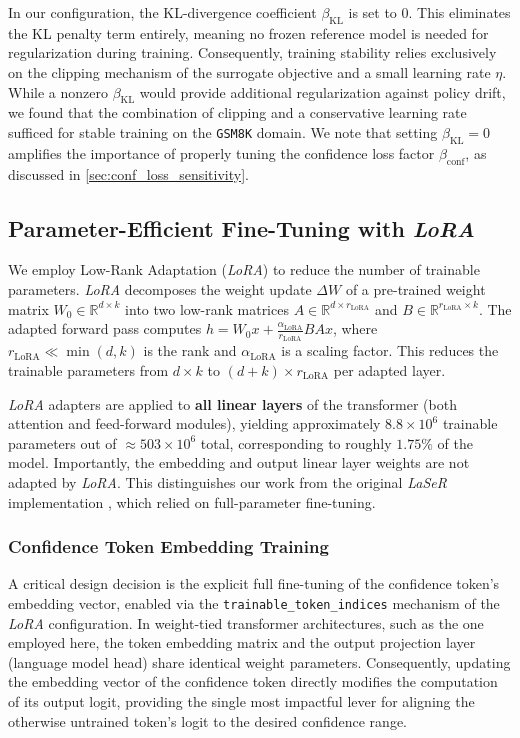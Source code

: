 \documentclass[a4paper,oneside,10pt,ngerman,english]{scrartcl}
\begin{document}
In our configuration, the KL-divergence coefficient $\beta_{\mathrm{KL}}$ is set to $0$. This eliminates the KL penalty term entirely, meaning no frozen reference model is needed for regularization during training. Consequently, training stability relies exclusively on the clipping mechanism of the surrogate objective and a small learning rate $\eta$. While a nonzero $\beta_{\mathrm{KL}}$ would provide additional regularization against policy drift, we found that the combination of clipping and a conservative learning rate sufficed for stable training on the \texttt{GSM8K} domain. We note that setting $\beta_{\mathrm{KL}} = 0$ amplifies the importance of properly tuning the confidence loss factor $\beta_{\mathrm{conf}}$, as discussed in \autoref{sec:conf_loss_sensitivity}.

\subsection{Parameter-Efficient Fine-Tuning with \textit{LoRA}}
\label{sec:lora}
We employ Low-Rank Adaptation (\textit{LoRA}) \citep{lora} to reduce the number of trainable parameters. \textit{LoRA} decomposes the weight update $\Delta W$ of a pre-trained weight matrix $W_0 \in \mathbb{R}^{d \times k}$ into two low-rank matrices $A \in \mathbb{R}^{d \times r_{\mathrm{LoRA}}}$ and $B \in \mathbb{R}^{r_{\mathrm{LoRA}} \times k}$. The adapted forward pass computes $h = W_0 x + \frac{\alpha_{\mathrm{LoRA}}}{r_{\mathrm{LoRA}}} B A x$, where $r_{\mathrm{LoRA}} \ll \min(d,k)$ is the rank and $\alpha_{\mathrm{LoRA}}$ is a scaling factor. This reduces the trainable parameters from $d \times k$ to $(d + k) \times r_{\mathrm{LoRA}}$ per adapted layer.

\textit{LoRA} adapters are applied to \textbf{all linear layers} of the transformer (both attention and feed-forward modules), yielding approximately $8.8 \times 10^6$ trainable parameters out of $\approx 503 \times 10^6$ total, corresponding to roughly $1.75\%$ of the model. Importantly, the embedding and output linear layer weights are not adapted by \textit{LoRA}. This distinguishes our work from the original \textit{LaSeR} implementation \citep{laser}, which relied on full-parameter fine-tuning.

\subsubsection{Confidence Token Embedding Training}
\label{sec:embedding_training}
A critical design decision is the explicit full fine-tuning of the confidence token's embedding vector, enabled via the \texttt{trainable\_token\_indices} mechanism of the \textit{LoRA} configuration. In weight-tied transformer architectures, such as the one employed here, the token embedding matrix and the output projection layer (language model head) share identical weight parameters. Consequently, updating the embedding vector of the confidence token directly modifies the computation of its output logit, providing the single most impactful lever for aligning the otherwise untrained token's logit to the desired confidence range.
\end{document}
